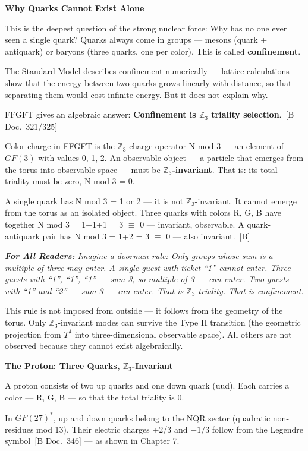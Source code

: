 \documentclass[11pt,oneside]{book}
\newcommand{\status}[1]{\penalty10000\,{\scriptsize\textcolor{gray!60}{[#1]}}}
\newenvironment{laierspur}{%
  \par\vspace{4pt}%
  \noindent\small\itshape\color{blue!60!black}%
  \textbf{For All Readers:}\enspace\ignorespaces}{%
  \par\vspace{4pt}\normalsize\normalfont\normalcolor}
\begin{document}
\textbf{Why Quarks Cannot Exist Alone}

This is the deepest question of the strong nuclear force: Why has no one
ever seen a single quark? Quarks always come in groups — mesons (quark +
antiquark) or baryons (three quarks, one per color). This is called
\textbf{confinement}.

The Standard Model describes confinement numerically — lattice calculations
show that the energy between two quarks grows linearly with distance, so
that separating them would cost infinite energy. But it does not explain why.

FFGFT gives an algebraic answer: \textbf{Confinement is $\mathbb{Z}_3$ triality
selection}. \status{B Doc.~321/325}

Color charge in FFGFT is the $\mathbb{Z}_3$ charge operator N mod 3 — an element of
$GF(3)$ with values {0, 1, 2}. An observable object — a particle that emerges
from the torus into observable space — must be $\mathbb{Z}_3$\textbf{-invariant}.
That is: its total triality must be zero, N mod 3 = 0.

A single quark has N mod 3 = 1 or 2 — it is not $\mathbb{Z}_3$-invariant.
It cannot emerge from the torus as an isolated object. Three quarks with
colors {R, G, B} have together N mod 3 = 1+1+1 = 3 $\equiv$ 0 — invariant,
observable. A quark-antiquark pair has N mod 3 = 1+2 = 3 $\equiv$ 0 —
also invariant. \status{B}

\begin{laierspur}
Imagine a doorman rule: Only groups whose sum is a multiple of three may
enter. A single guest with ticket \enquote{1} cannot enter. Three guests with \enquote{1},
\enquote{1}, \enquote{1} — sum 3, so multiple of 3 — can enter. Two guests with \enquote{1} and
\enquote{2} — sum 3 — can enter. That is $\mathbb{Z}_3$ triality. That is confinement.
\end{laierspur}

This rule is not imposed from outside — it follows from the geometry of the
torus. Only $\mathbb{Z}_3$-invariant modes can survive the Type II transition
(the geometric projection from $T^4$ into three-dimensional observable space).
All others are not observed because they cannot exist algebraically.

\textbf{The Proton: Three Quarks, $\mathbb{Z}_3$-Invariant}

A proton consists of two up quarks and one down quark (uud). Each carries a
color — {R, G, B} — so that the total triality is 0.

In $GF(27)^*$, up and down quarks belong to the NQR sector (quadratic
non-residues mod 13). Their electric charges +2/3 and $-1/3$ follow from the
Legendre symbol \status{B Doc.~346} — as shown in Chapter 7.
\end{document}
